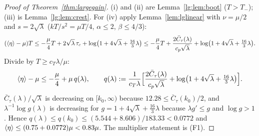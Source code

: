 \begin{proof}[Proof of Theorem~\ref{thm:largegain}]
(i) and (ii) are Lemma~\ref{lg:lem:boot} ($T>T_-$); (iii) is Lemma~\ref{lg:lem:crest}. For (iv) apply Lemma~\ref{lem:lglinear} with $\nu=\mu/2$ and $s=2\sqrt\lambda$
($kT/s^2=\mu T/4$, $\alpha\le2$, $\beta\le4/3$):
\[
(\left\langle \eta\right\rangle-\mu)T\le-\frac\mu4T+2\sqrt\lambda\,\tau_c+\log\bigl(1+4\sqrt\lambda+\tfrac{16}3\lambda\bigr)
\le-\frac\mu4T+\frac{2\bar C_\tau(\lambda)}{c_p\sqrt\lambda}+\log\bigl(1+4\sqrt\lambda+\tfrac{16}3\lambda\bigr).
\]
Divide by $T\ge c_T\lambda/\mu$:
\[
\left\langle \eta\right\rangle-\mu\le-\frac\mu4+\mu\,q(\lambda),\qquad
q(\lambda):=\frac{1}{c_T\lambda}\Bigl[\frac{2\bar C_\tau(\lambda)}{c_p\sqrt\lambda}+\log\bigl(1+4\sqrt\lambda+\tfrac{16}3\lambda\bigr)\Bigr].
\]
$\bar C_\tau(\lambda)/\sqrt\lambda$ is decreasing on $[k_0,\infty)$ because $12.28\le\bar C_\tau(k_0)/2$, and
$\lambda^{-1}\log g(\lambda)$ is decreasing for $g=1+4\sqrt\lambda+\frac{16}3\lambda$ because
$\lambda g'\le g$ and $\log g>1$. Hence $q(\lambda)\le q(k_0)\le(5.544+8.606)/183.33<0.0772$ and
$\left\langle \eta\right\rangle\le(0.75+0.0772)\mu<0.83\mu$. The multiplier statement is (F1).
\end{proof}

